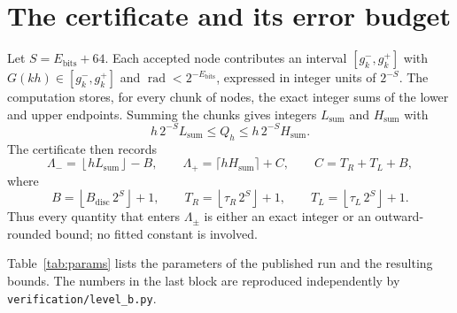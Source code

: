 \documentclass[11pt,a4paper]{article}
\theoremstyle{remark}
\newcommand{\floor}[1]{\left\lfloor #1 \right\rfloor}
\DeclareMathOperator{\rad}{rad}
\begin{document}
\section{The certificate and its error budget}

Let $S=E_{\mathrm{bits}}+64$. Each accepted node contributes an interval
$[g_k^-,g_k^+]$ with $G(kh)\in[g_k^-,g_k^+]$ and
$\rad<2^{-E_{\mathrm{bits}}}$, expressed in integer units of $2^{-S}$.
The computation stores, for every chunk of nodes, the exact integer sums
of the lower and upper endpoints. Summing the chunks gives integers
$L_{\mathrm{sum}}$ and $H_{\mathrm{sum}}$ with
\begin{equation}
  h\,2^{-S}L_{\mathrm{sum}}\le Q_h\le h\,2^{-S}H_{\mathrm{sum}} .
\end{equation}
The certificate then records
\begin{equation}
  \Lambda_-=\floor{hL_{\mathrm{sum}}}-B,\qquad
  \Lambda_+=\lceil hH_{\mathrm{sum}}\rceil+C,\qquad
  C=T_R+T_L+B,
  \label{eq:cert}
\end{equation}
where
\begin{equation}
  B=\floor{B_{\mathrm{disc}}\,2^S}+1,\qquad
  T_R=\floor{\tau_R\,2^S}+1,\qquad
  T_L=\floor{\tau_L\,2^S}+1 .
\end{equation}
Thus every quantity that enters $\Lambda_\pm$ is either an exact integer
or an outward-rounded bound; no fitted constant is involved.

Table~\ref{tab:params} lists the parameters of the published run and the
resulting bounds. The numbers in the last block are reproduced
independently by \texttt{verification/level\_b.py}.
\end{document}
